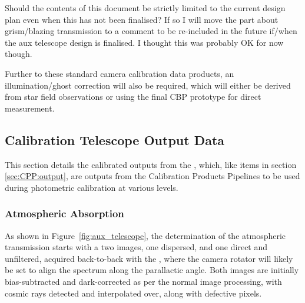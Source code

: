 \begin{itemize}

\end{itemize}

\begin{note}
	Should the contents of this document be strictly limited to the current design plan even when this has not been finalised? If so I will move the part about grism/blazing transmission to a comment to be re-included in the future if/when the aux telescope design is finalised. I thought this was probably OK for now though.
\end{note}

Further to these standard camera calibration data products, an illumination/ghost correction will also be required, which will either be derived from star field observations or using the final CBP prototype for direct measurement.







\subsection{Calibration Telescope Output Data}
\label{sec:CPP:auxTelescope:outputs}
This section details the calibrated outputs from the \auxtelescope, which, like items in section \secsymbol\ref{sec:CPP:output}, are outputs from the Calibration Products Pipelines to be used during photometric calibration at various levels.

\subsubsection{Atmospheric Absorption}\label{sec:CPP:aux:atmosphericAbsorption}
As shown in Figure~\ref{fig:aux_telescope}, the determination of the atmospheric transmission starts with a two images, one dispersed, and one direct and unfiltered, acquired back-to-back with the \auxtelescope, where the camera rotator will likely be set to align the spectrum along the parallactic angle. Both images are initially bias-subtracted and dark-corrected as per the normal image processing, with cosmic rays detected and interpolated over, along with defective pixels.

